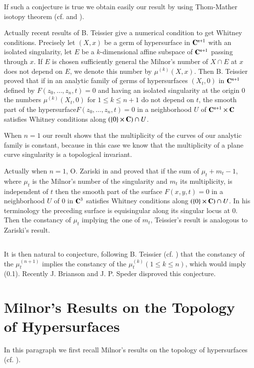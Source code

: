 If such a conjecture is true we obtain easily our result by using Thom-Mather isotopy theorem (cf. \cite{art10-key16} and \cite{art10-key7}).

Actually recent results of B. Teissier \cite{art10-key14} give a numerical condition to get Whitney conditions. Precisely let $(X, x)$ be a germ of hypersurface in $\mathbf{C}^{n+1}$ with an isolated singularity, let $E$ be a $k$-dimensional affine subspace of $\mathbf{C}^{n+1}$ passing through $x$. If $E$ is chosen sufficiently general the Milnor's number of $X \cap E$ at $x$ does not depend on $E$, we denote this number by $\mu^{(k)} (X,x)$. Then B. Teissier proved that if in an analytic family of germs of hypersurfaces $(X_t, 0)$ in $\mathbf{C}^{n+1}$ defined by $F(z_0,\ldots, z_n ,t)=0$ and having an isolated singularity at the origin  0 the  numbers $\mu^{(k)} (X_t, 0)$ for $1 \leqslant k \leqslant n+1$ do not depend on $t$, the smooth part of the hypersurface\pageoriginale $F(z_0, \ldots, z_n, t)=0$ in a neighborhood $U$ of $\mathbf{C}^{n+1} \times \mathbf{C}$ satisfies Whitney conditions along $(\{0\} \times \mathbf{C}) \cap U$.

When $n=1$ our result shows that the multiplicity of the curves of our analytic family is constant, because in this case we know that the multiplicity of a plane curve singularity is a topological invariant. 

Actually when $n=1$, O. Zariski in \cite{art10-key19} and \cite{art10-key20} proved that if the sum of $\mu_t + m_t -1$, where $\mu_t$ is the Milnor's number of the singularity and $m_t$ its multiplicity, is independent of $t$ then the smooth part of the surface $F(x,y,t)=0$ in a neighborhood $U$ of 0 in $\mathbf{C}^3$ satisfies Whitney conditions along $(\{0\} \times \mathbf{C}) \cap U$. In his terminology the preceding surface is equisingular along its singular locus at 0. Then the constancy of $\mu_t$ implying the one of $m_t$, Teissier's result is analogous to Zariski's result.

\subsection{}  
It is then natural to conjecture, following B. Teissier (cf. \cite{art10-key14}) that the constancy of the $\mu^{(n+1)}_t$ implies the constancy of the $\mu^{(k)}_t (1 \leqslant k \leqslant n)$, which would imply (0.1). Recently J. Brianson and J. P. Speder disproved this conjecture.

\section{Milnor's Results on the Topology of Hypersurfaces}\label{art10-sec1}
In this paragraph we first recall Milnor's results on the topology of hypersurfaces (cf. \cite{art10-key9}).

